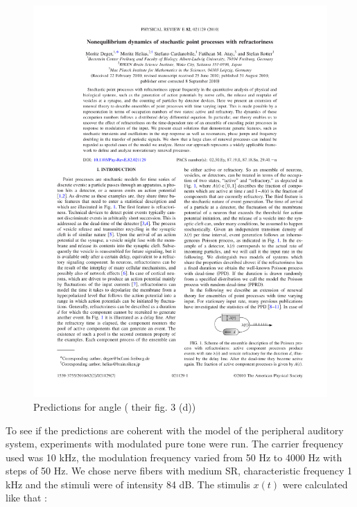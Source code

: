 \begin{figure}[h]
	\centering
	\includegraphics*[page=4,viewport=433 567 566 617]{images/Deger2010.pdf} %
	\caption{Predictions for angle (\cite{Deger} their fig. 3 (d))}
	\label{fig:predangle}
\end{figure}

To see if the predictions are coherent with the model of the peripheral auditory 
system, experiments with modulated pure tone were run. 
The carrier frequency used was 10 kHz, the modulation frequency varied from 50 Hz to 4000 Hz
with steps of 50 Hz. We chose nerve fibers with medium SR, characteristic frequency 1 kHz 
and the stimuli were of intensity 84 dB.
The stimulis $x\left(t\right)$ were calculated like that :

